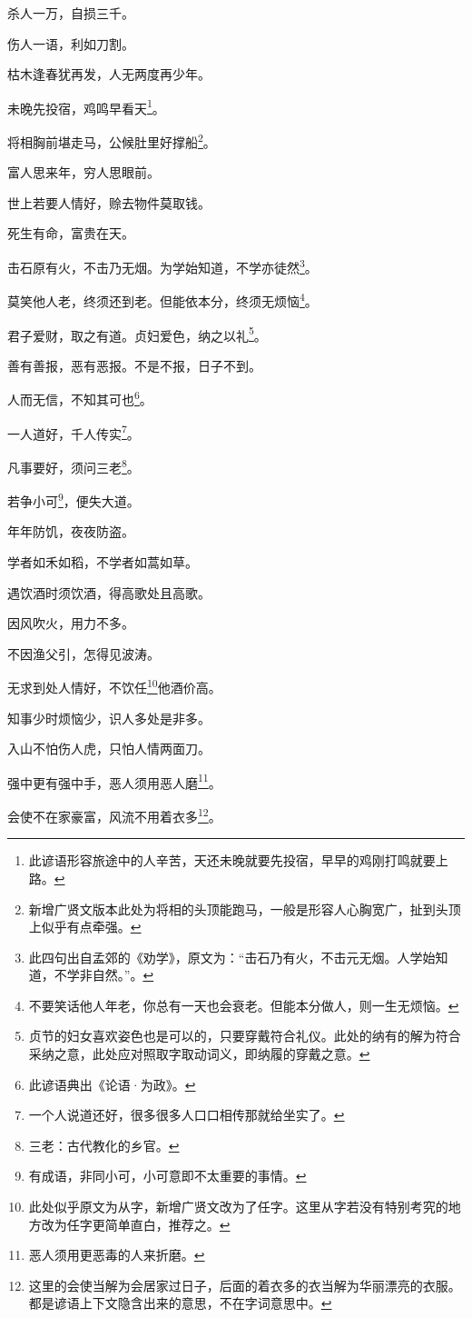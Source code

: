\documentclass[12pt,oneside]{book}
\begin{document}
杀人一万，自损三千。

伤人一语，利如刀割。

枯木逢春犹再发，人无两度再少年。

未晚先投宿，鸡鸣早看天\footnote{此谚语形容旅途中的人辛苦，天还未晚就要先投宿，早早的鸡刚打鸣就要上路。}。

将相胸前堪走马，公候肚里好撑船\footnote{新增广贤文版本此处为将相的头顶能跑马，一般是形容人心胸宽广，扯到头顶上似乎有点牵强。}。

富人思来年，穷人思眼前。

世上若要人情好，赊去物件莫取钱。

死生有命，富贵在天。

击石原有火，不击乃无烟。为学始知道，不学亦徒然\footnote{此四句出自孟郊的《劝学》，原文为：“击石乃有火，不击元无烟。人学始知道，不学非自然。”。}。

莫笑他人老，终须还到老。但能依本分，终须无烦恼\footnote{不要笑话他人年老，你总有一天也会衰老。但能本分做人，则一生无烦恼。}。

君子爱财，取之有道。贞妇爱色，纳之以礼\footnote{贞节的妇女喜欢姿色也是可以的，只要穿戴符合礼仪。此处的纳有的解为符合采纳之意，此处应对照取字取动词义，即纳履的穿戴之意。}。

善有善报，恶有恶报。不是不报，日子不到。

人而无信，不知其可也\footnote{此谚语典出《论语·为政》。}。

一人道好，千人传实\footnote{一个人说道还好，很多很多人口口相传那就给坐实了。}。

凡事要好，须问三老\footnote{三老：古代教化的乡官。}。

若争小可\footnote{有成语，非同小可，小可意即不太重要的事情。}，便失大道。

年年防饥，夜夜防盗。

学者如禾如稻，不学者如蒿如草。

遇饮酒时须饮酒，得高歌处且高歌。

因风吹火，用力不多。

不因渔父引，怎得见波涛。

无求到处人情好，不饮任\footnote{此处似乎原文为从字，新增广贤文改为了任字。这里从字若没有特别考究的地方改为任字更简单直白，推荐之。}他酒价高。

知事少时烦恼少，识人多处是非多。

入山不怕伤人虎，只怕人情两面刀。

强中更有强中手，恶人须用恶人磨\footnote{恶人须用更恶毒的人来折磨。}。

会使不在家豪富，风流不用着衣多\footnote{这里的会使当解为会居家过日子，后面的着衣多的衣当解为华丽漂亮的衣服。都是谚语上下文隐含出来的意思，不在字词意思中。}。
\end{document}
